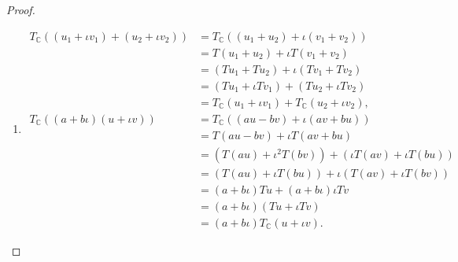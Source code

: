 \begin{proof}
    \begin{enumerate}[label={(\alph*)}]
        \item \begingroup\allowdisplaybreaks
              \begin{align*}
                  T_{\mathbb{C}}((u_{1} + \iota v_{1}) + (u_{2} + \iota v_{2})) & = T_{\mathbb{C}}((u_{1} + u_{2}) + \iota (v_{1} + v_{2}))                    \\
                                                                                & = T(u_{1} + u_{2}) + \iota T(v_{1} + v_{2})                                  \\
                                                                                & = (Tu_{1} + Tu_{2}) + \iota (Tv_{1} + Tv_{2})                                \\
                                                                                & = (Tu_{1} + \iota Tv_{1}) + (Tu_{2} + \iota Tv_{2})                          \\
                                                                                & = T_{\mathbb{C}}(u_{1} + \iota v_{1}) + T_{\mathbb{C}}(u_{2} + \iota v_{2}), \\
                  T_{\mathbb{C}}((a + b\iota)(u + \iota v))                     & = T_{\mathbb{C}}((au - bv) + \iota (av + bu))                                \\
                                                                                & = T(au - bv) + \iota T(av + bu)                                              \\
                                                                                & = (T(au) + \iota^{2} T(bv)) + (\iota T(av) + \iota T(bu))                    \\
                                                                                & = (T(au) + \iota T(bu)) + \iota (T(av) + \iota T(bv))                        \\
                                                                                & = (a + b\iota) Tu + (a + b\iota)\iota Tv                                     \\
                                                                                & = (a + b\iota) (Tu + \iota Tv)                                               \\
                                                                                & = (a + b\iota) T_{\mathbb{C}}(u + \iota v).
              \end{align*}
              \endgroup


\end{enumerate}
\end{proof}
